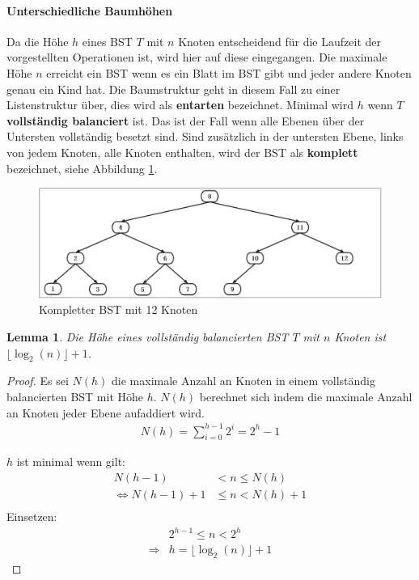 \documentclass[a4paper,12pt]{article}
\newtheorem{Lemma}{Lemma}[section]
\begin{document}
\paragraph{Unterschiedliche Baumhöhen}
Da die Höhe $h$ eines BST $T$ mit $n$ Knoten entscheidend für die Laufzeit der vorgestellten Operationen ist, wird hier auf diese eingegangen. Die maximale Höhe $n$ erreicht ein BST wenn es ein Blatt im BST gibt und jeder andere Knoten genau ein Kind hat. Die Baumstruktur geht in diesem Fall zu einer Listenstruktur über, dies wird als \textbf{entarten} bezeichnet. Minimal wird $h$ wenn $T$ \textbf{vollständig balanciert} ist. Das ist der Fall wenn alle Ebenen über der Untersten vollständig besetzt sind. Sind zusätzlich in der untersten Ebene, links von jedem Knoten, alle Knoten enthalten, wird der BST als \textbf{komplett} bezeichnet, siehe Abbildung \ref{fig:kompletterBaum}. 
\begin{figure}[H]
	\centering
	\includegraphics[width= 1\textwidth]{"Medien/Einleitung/kompletterBaum"}
	\caption{Kompletter BST mit 12 Knoten}
	\label{fig:kompletterBaum}
\end{figure}


\begin{Lemma} Die Höhe eines vollständig balancierten BST $T$ mit $n$ Knoten ist $ \lfloor \log_2{(n)} \rfloor + 1 $. 
\end{Lemma}
\begin{proof}
	
	Es sei $\mathit{N(h)}$ die maximale Anzahl an Knoten in einem vollständig balancierten BST mit Höhe $h$.
	$\mathit{N(h)}$  berechnet sich indem die maximale Anzahl an Knoten jeder Ebene aufaddiert wird.\\
	\begin{align*}
	\mathit{N(h)} = \sum\limits_{i=0}^{h-1} 2^i = 2^h - 1 
	\end{align*}
	
	\noindent	$h$ ist minimal wenn gilt:\\
	\begin{align*}
	\mathit{N(h-1)} &< n \leq \mathit{N(h)}\\
	\Leftrightarrow \mathit{N(h-1)} + 1 &\leq n < \mathit{N(h)} + 1\\
	\end{align*}
	Einsetzen:\\
	\begin{align*}
	&2^{h - 1} \leq n < 2^h\\
	\Rightarrow & h =  \lfloor \log_2{(n)} \rfloor + 1
	\end{align*}
	
\end{proof}
\end{document}

